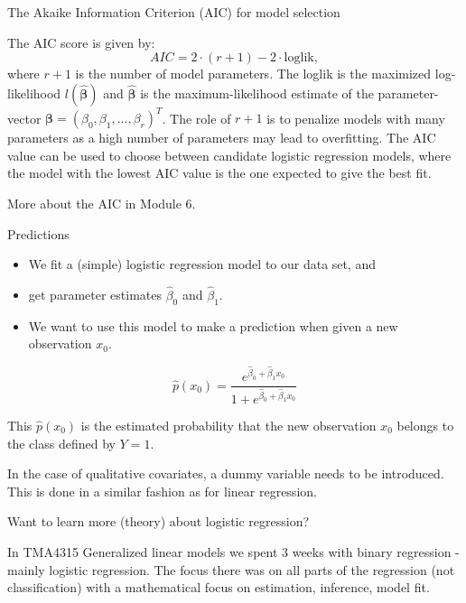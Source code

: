\documentclass[10pt,ignorenonframetext,]{beamer}
\providecommand{\tightlist}{%
  \setlength{\itemsep}{0pt}\setlength{\parskip}{0pt}}
\begin{document}
\begin{frame}

\begin{block}{The Akaike Information Criterion (AIC) for model
selection}

The AIC score is given by:
\[AIC = 2 \cdot (r+1) -2 \cdot \text{loglik},\] where \(r+1\) is the
number of model parameters. The loglik is the maximized log-likelihood
\(l(\hat{\boldsymbol{\beta}})\) and \(\hat{\boldsymbol{\beta}}\) is the
maximum-likelihood estimate of the parameter-vector
\(\boldsymbol{\beta} = (\beta_0, \beta_1, ..., \beta_{r})^T\). The role
of \(r+1\) is to penalize models with many parameters as a high number
of parameters may lead to overfitting. The AIC value can be used to
choose between candidate logistic regression models, where the model
with the lowest AIC value is the one expected to give the best fit.

More about the AIC in Module 6.

\end{block}

\end{frame}

\begin{frame}

\begin{block}{Predictions}

\begin{itemize}
\tightlist
\item
  We fit a (simple) logistic regression model to our data set, and
\item
  get parameter estimates \(\hat{\beta}_0\) and \(\hat{\beta}_1\).
\item
  We want to use this model to make a prediction when given a new
  observation \(x_0\).
\end{itemize}

\[\hat{p}(x_0) = \frac{e^{\hat{\beta}_0 + \hat{\beta}_1 x_0}}{1+e^{\hat{\beta}_0 + \hat{\beta}_1 x_0}} \]

This \(\hat{p}(x_0)\) is the estimated probability that the new
observation \(x_0\) belongs to the class defined by \(Y=1\).

In the case of qualitative covariates, a dummy variable needs to be
introduced. This is done in a similar fashion as for linear regression.

\end{block}

\end{frame}

\begin{frame}

\begin{block}{Want to learn more (theory) about logistic regression?}

In TMA4315 Generalized linear models we spent 3 weeks with binary
regression - mainly logistic regression. The focus there was on all
parts of the regression (not classification) with a mathematical focus
on estimation, inference, model fit.

\end{block}

\end{frame}
\end{document}
